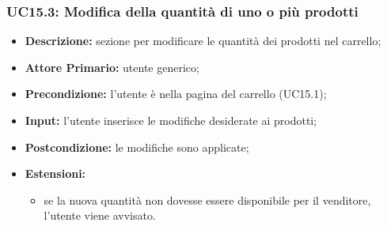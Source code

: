         \subsubsection{UC15.3: Modifica della quantità di uno o più prodotti}
        \begin{itemize}
            \item \textbf{Descrizione:} sezione per modificare le quantità dei prodotti nel carrello;
            \item \textbf{Attore Primario:} utente generico;
            \item \textbf{Precondizione:} l'utente è nella pagina del carrello (UC15.1);
            \item \textbf{Input:} l'utente inserisce le modifiche desiderate ai prodotti;
            \item \textbf{Postcondizione:} le modifiche sono applicate;
            \item \textbf{Estensioni:} 
                \begin{itemize}
                    \item se la nuova quantità non dovesse essere disponibile per il venditore, l'utente viene avvisato.
                \end{itemize}
        \end{itemize}

        
